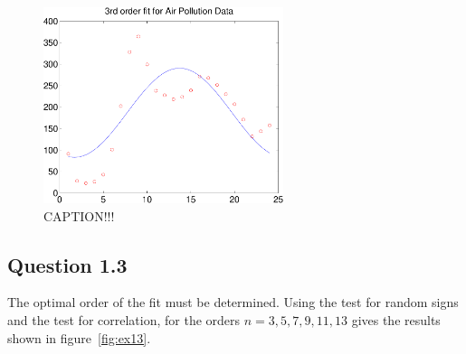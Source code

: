 \begin{figure}[ht]
    \centering
    \includegraphics[width=70mm]{../media/3rd-order-fit.pdf}
    \caption{CAPTION!!!}
    \label{fig:3rd-order-fit}
\end{figure}

\subsection*{Question 1.3}


The optimal order of the fit must be determined. Using the test for random
signs and the test for correlation, for the orders $n=3,5,7,9,11,13$ gives the
results shown in figure~\ref{fig:ex13}.

